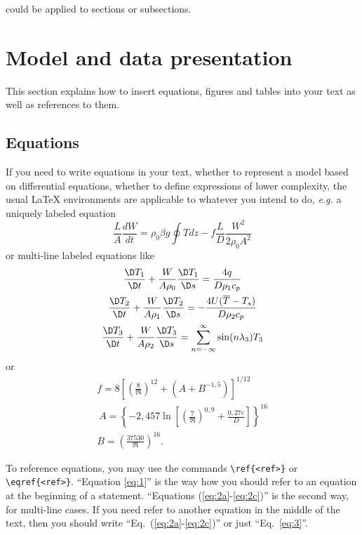 \documentclass[date,twocolumn,a4paper]{ppgem}
\begin{document}
could be applied to sections or subsections. 

\section{Model and data presentation}

This section explains how to insert equations, figures and tables into
your text as well as references to them.

\subsection{Equations \label{subsec:eqs}}

If you need to write equations in your text, whether to represent a
model based on differential equations, whether to define expressions of
lower complexity, the usual {\LaTeX} environments are applicable to
whatever you intend to do, \textit{e.g.} a uniquely labeled equation
%
\begin{equation}
\label{eq:1}
  \frac{L}{A}\frac{dW}{dt}=\rho_0\beta g\oint Tdz-f\frac{L}{D}\frac{W^2}{2\rho_0A^2}
\end{equation}
%
or multi-line labeled equations like 
%
\begin{subequations}
\label{eq:2}
\begin{gather}
\frac{\D T_1}{\D t}+\frac{W}{A\rho_0}\frac{\D T_1}{\D s} = \frac{4q}{D\rho_1c_p} \label{eq:2a} \\
\frac{\D T_2}{\D t}+\frac{W}{A\rho_1}\frac{\D T_2}{\D s} = -\frac{4U(\overline{T}-T_s)}{D\rho_2c_p} \label{eq:2b} \\
\frac{\D T_3}{\D t}+\frac{W}{A\rho_2}\frac{\D T_3}{\D s} =  \displaystyle \sum_{n=-\infty}^{\infty} \sin(n \lambda_3)T_3 \label{eq:2c}
 \end{gather}
\end{subequations}
%
or
%
\begin{gather}
\label{eq:3}
  f = 8\left[\left(\frac{8}{\Re}\right)^{12} + (A+B^{-1,5})\right]^{1/12} \\\
  A = \left\{-2,457\ln\left[\left(\frac{7}{\Re}\right)^{0,9} + \frac{0,27e}{D}\right]\right\}^{16} \\
  B = \left(\frac{37530}{\Re}\right)^{16} .
\end{gather}

To reference equations, you may use the commands \verb|\ref{<ref>}| or
\verb|\eqref{<ref>}|. ``Equation \eqref{eq:1}'' is the way how you
should refer to an equation at the beginning of a statement. ``Equations
(\ref{eq:2a}-\ref{eq:2c})'' is the second way, for multi-line cases. If
you need refer to another equation in the middle of the text, then you
should write ``Eq.~(\ref{eq:2a}-\ref{eq:2c})'' or just
``Eq.~\eqref{eq:3}''.
\end{document}
